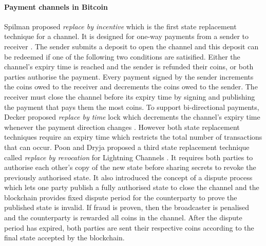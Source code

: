 \documentclass{llncs}
\begin{document}
\paragraph{Payment channels in Bitcoin} 
Spilman proposed \textit{replace by incentive} which is the first state replacement technique for a channel.
It is designed for one-way payments from a sender to receiver \cite{spilman2013}.
The sender submits a deposit to open the channel and this deposit can be redeemed if one of the following two conditions are satisified. 
Either the channel's expiry time is reached and the sender is refunded their coins, or both parties authorise the payment. 
Every payment signed by the sender increments the coins owed to the receiver and decrements the coins owed to the sender.  
The receiver must close the channel before its expiry time by signing and publishing the payment that pays them the most coins. 
To support bi-directional payments, Decker proposed \textit{replace by time} lock which decrements the channel's expiry time whenever the payment direction changes \cite{decker2015fast}.
However both state replacement techniques require an expiry time which restricts the total number of transactions that can occur. 
Poon and Dryja proposed a third state replacement technique called \textit{replace by revocation} for Lightning Channels \cite{poon2016bitcoin}.  
It requires both parties to authorise each other's copy of the new state before sharing secrets to revoke the previously authorised state. 
It also introduced the concept of a dispute process which lets one party publish a fully authorised state to close the channel and the blockchain provides fixed dispute period for the counterparty to prove the published state is invalid.
If fraud is proven, then the broadcaster is penalised and the counterparty is rewarded all coins in the channel.
After the dispute period has expired, both parties are sent their respective coins according to the final state accepted by the blockchain. 
\end{document}
